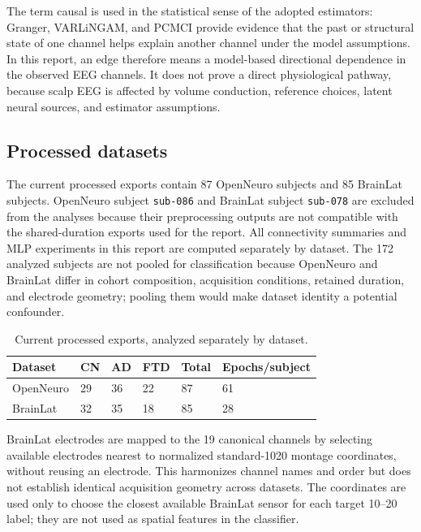 \documentclass[11pt,a4paper]{article}
\begin{document}
The term causal is used in the statistical sense of the adopted estimators:
Granger, VARLiNGAM, and PCMCI provide evidence that the past or structural
state of one channel helps explain another channel under the model
assumptions. In this report, an edge therefore means a model-based
directional dependence in the observed EEG channels. It does not prove a
direct physiological pathway, because scalp EEG is affected by volume
conduction, reference choices, latent neural sources, and estimator
assumptions.

\subsection{Processed datasets}

The current processed exports contain 87 OpenNeuro subjects and 85
BrainLat subjects. OpenNeuro subject \texttt{sub-086} and BrainLat subject
\texttt{sub-078} are excluded from the analyses because their preprocessing
outputs are not compatible with the shared-duration exports used for the
report. All connectivity summaries and MLP experiments in this report are
computed separately by dataset. The 172 analyzed subjects are not pooled for
classification because OpenNeuro and BrainLat differ in cohort composition,
acquisition conditions, retained duration, and electrode geometry; pooling
them would make dataset identity a potential confounder.

\begin{table}[H]
\centering\small
\begin{tabular}{llllll}
\toprule
Dataset & CN & AD & FTD & Total & Epochs/subject \\
\midrule
OpenNeuro & 29 & 36 & 22 & 87 & 61 \\
BrainLat & 32 & 35 & 18 & 85 & 28 \\
\bottomrule
\end{tabular}
\caption{Current processed exports, analyzed separately by dataset.}
\end{table}


BrainLat electrodes are mapped to the 19 canonical channels by selecting
available electrodes nearest to normalized standard-1020 montage coordinates,
without reusing an electrode. This harmonizes channel names and order but
does not establish identical acquisition geometry across datasets.
The coordinates are used only to choose the closest available BrainLat sensor
for each target 10--20 label; they are not used as spatial features in the
classifier.
\end{document}
